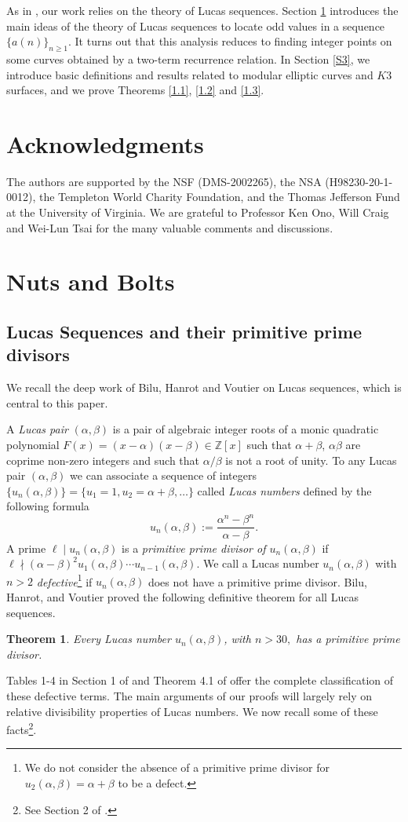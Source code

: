 \documentclass[12pt]{amsart}
\newtheorem{thm}{Theorem}[section]
\newcommand{\Z}{\mathbb{Z}}
\numberwithin{equation}{section}
\begin{document}
As in \cite{BCO, BCOT}, our work relies on the theory of Lucas sequences. Section \ref{S2} introduces the main ideas of the theory of Lucas sequences to locate odd values in a sequence $\{a(n)\}_{n\geq 1}$. It turns out that this analysis reduces to finding integer points on some curves obtained by a two-term recurrence relation. In Section \ref{S3}, we introduce basic definitions and results related to modular elliptic curves and $K3$ surfaces, and we prove Theorems \ref{1.1},\,\,\ref{1.2} and \ref{1.3}.

\section*{Acknowledgments}
The authors are supported by the NSF (DMS-2002265), the NSA (H98230-20-1-0012), the Templeton World Charity Foundation, and the Thomas Jefferson Fund at the University of Virginia. We are grateful to Professor Ken Ono, Will Craig and Wei-Lun Tsai for the many valuable comments and discussions.

\section{Nuts and Bolts}\label{S2}
\subsection{Lucas Sequences and their primitive prime divisors}
We recall the deep work of Bilu, Hanrot and Voutier \cite{BHV} on Lucas sequences, which is central to this paper. 

A \textit{Lucas pair} $(\alpha,\beta)$ is a pair of algebraic integer roots of a monic quadratic polynomial $F(x)=(x-\alpha)(x-\beta)\in \Z[x]$ such that $\alpha+\beta$, $\alpha \beta$ are coprime non-zero integers and such that $\alpha/\beta$ is not a root of unity. To any Lucas pair $(\alpha,\beta)$ we can associate a sequence of integers $\{u_n(\alpha,\beta)\}=\{u_1=1, u_2=\alpha+\beta,\dots\}$ called \textit{Lucas numbers} defined by the following formula  
\begin{equation}
u_n(\alpha,\beta):=\frac{\alpha^n-\beta^n}{\alpha-\beta}.
\end{equation}
A prime  $\ell \mid u_{n}(\alpha,\beta)$ is a {\it primitive prime divisor of $u_n(\alpha,\beta)$} if $\ell \nmid (\alpha-\beta)^2 u_1(\alpha,\beta)\cdots u_{n-1}(\alpha, \beta)$. We call a Lucas number $u_n(\alpha,\beta)$ with $n>2$ {\it defective}\footnote{We do not consider the absence of
a primitive prime divisor for $u_2(\alpha,\beta)=\alpha+\beta$ to be   a defect.}  if $u_{n}(\alpha,\beta)$ does not have a primitive prime divisor. Bilu, Hanrot, and Voutier \cite{BHV} proved the following definitive theorem for all Lucas sequences.
\begin{thm}\label{Bilu}
Every Lucas number $u_n(\alpha,\beta)$, with $n>30,$
has a primitive prime divisor.
\end{thm}
 Tables 1-4 in Section 1 of \cite{BHV} and Theorem 4.1 of \cite{Abouzaid} offer the complete classification of these defective terms. The main arguments of our proofs will largely rely on relative divisibility properties of Lucas numbers. We now recall some of these facts\footnote{See Section 2 of \cite{BHV}.}.
\end{document}
